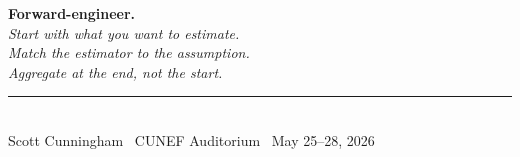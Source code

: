 \documentclass[aspectratio=169,11pt]{beamer}
\begin{document}
\begin{frame}[plain]
\centering
\vspace{2.5em}
{\Huge\bfseries\color{forest} Forward-engineer.}\\[1.5em]
{\Large\itshape\color{charcoal} Start with what you want to estimate.\\Match the estimator to the assumption.\\Aggregate at the end, not the start.}\\[2em]
\rule{0.4\textwidth}{0.6pt}\\[0.8em]
{\small\color{warmgray} Scott Cunningham \textperiodcentered\ CUNEF Auditorium \textperiodcentered\ May 25--28, 2026}
\end{frame}
\end{document}
